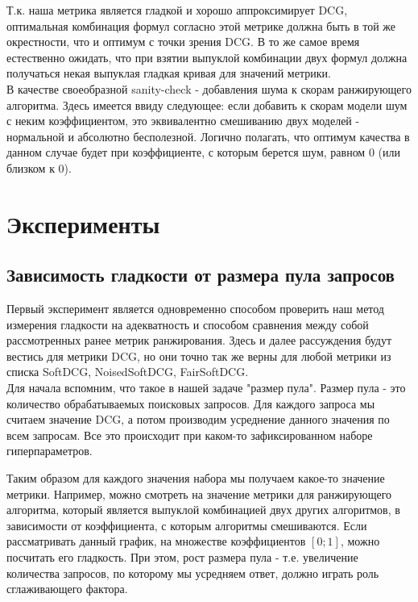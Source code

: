 \documentclass[14pt,a4paper]{amsart}
\theoremstyle{definition}
\theoremstyle{definition}
\begin{document}
Т.к. наша метрика является гладкой и хорошо аппроксимирует DCG, оптимальная комбинация формул согласно этой метрике должна быть в той же окрестности, что и оптимум с точки зрения DCG. В то же самое время естественно ожидать, что при взятии выпуклой комбинации двух формул должна получаться некая выпуклая гладкая кривая для значений метрики. \\

В качестве своеобразной sanity-check - добавления шума к скорам ранжирующего алгоритма. Здесь имеется ввиду следующее: если добавить к скорам модели шум с неким коэффициентом, это эквивалентно смешиванию двух моделей - нормальной и абсолютно бесполезной. Логично полагать, что оптимум качества в данном случае будет при коэффициенте, с которым берется шум, равном 0 (или близком к 0).


\newpage
\section{Эксперименты}

\subsection{Зависимость гладкости от размера пула запросов}

Первый эксперимент является одновременно способом проверить наш метод измерения гладкости на адекватность и способом сравнения между собой рассмотренных ранее метрик ранжирования. Здесь и далее рассуждения будут вестись для метрики DCG, но они точно так же верны для любой метрики из списка SoftDCG, NoisedSoftDCG, FairSoftDCG.\\

Для начала вспомним, что такое в нашей задаче "размер пула". Размер пула - это количество обрабатываемых поисковых запросов. Для каждого запроса мы считаем значение DCG, а потом производим усреднение данного значения по всем запросам. Все это происходит при каком-то зафиксированном наборе гиперпараметров.\\


Таким образом для каждого значения набора мы получаем какое-то значение метрики. Например, можно смотреть на значение метрики для ранжирующего алгоритма, который является выпуклой комбинацией двух других алгоритмов, в зависимости от коэффициента, с которым алгоритмы смешиваются. Если рассматривать данный график, на множестве коэффициентов $[0;1]$, можно посчитать его гладкость. При этом, рост размера пула - т.е. увеличение количества запросов, по которому мы усредняем ответ, должно играть роль сглаживающего фактора. \\
\end{document}
